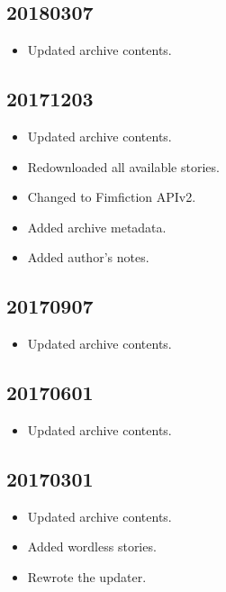 \documentclass[hidelinks,a4paper,12pt]{article}
\begin{document}
\subsection{20180307}  \label{sec:changelog_20180307}

\begin{itemize}
\item Updated archive contents.
\end{itemize}

\subsection{20171203}  \label{sec:changelog_20171203}

\begin{itemize}
\item Updated archive contents.
\item Redownloaded all available stories.
\item Changed to Fimfiction APIv2.
\item Added archive metadata.
\item Added author's notes.
\end{itemize}

\subsection{20170907}  \label{sec:changelog_20170907}

\begin{itemize}
\item Updated archive contents.
\end{itemize}

\subsection{20170601}  \label{sec:changelog_20170601}

\begin{itemize}
\item Updated archive contents.
\end{itemize}

\subsection{20170301}  \label{sec:changelog_20170301}

\begin{itemize}
\item Updated archive contents.
\item Added wordless stories.
\item Rewrote the updater.
\end{itemize}
\end{document}
